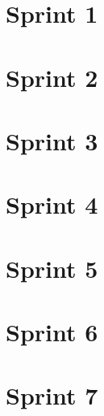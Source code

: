 \section{Sprint 1}
    
    
\section{Sprint 2}
    
    
\section{Sprint 3}
    

\section{Sprint 4}
    
    
\section{Sprint 5}
    
    
\section{Sprint 6}
    

\section{Sprint 7}
    
